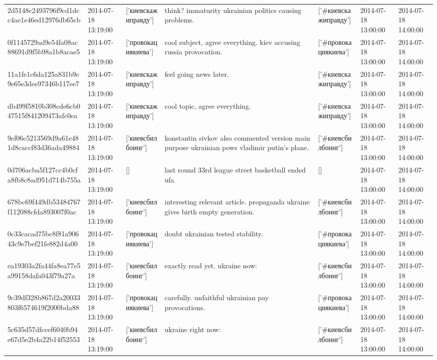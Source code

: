 \begin{tabular}{lllllll}
2d5148c2493796f9cd1dcc4ae1e46ed12976db65cb & 2014-07-18 13:19:00 & ['киевскажиправду'] & think? immaturity ukrainian politics causing problems. & ['#киевскажиправду'] & 2014-07-18 13:00:00 & 2014-07-18 14:00:00 \\
0f1145729ad9e54fa08ac88691d9f5b98a1b8acae5 & 2014-07-18 13:19:00 & ['провокациякиева'] & cool subject, agree everything. kiev accusing russia provocation. & ['#провокациякиева'] & 2014-07-18 13:00:00 & 2014-07-18 14:00:00 \\
11a1fe1c6da125a831b9e9e65e3dee97346b117ee7 & 2014-07-18 13:19:00 & ['киевскажиправду'] & feel going news later. & ['#киевскажиправду'] & 2014-07-18 13:00:00 & 2014-07-18 14:00:00 \\
db499f5810b308cde6cb047515f841209473afc0ea & 2014-07-18 13:19:00 & ['киевскажиправду'] & cool topic, agree everything. & ['#киевскажиправду'] & 2014-07-18 13:00:00 & 2014-07-18 14:00:00 \\
9ef06c5213569d9a61e481d8caccf83d36ada49884 & 2014-07-18 13:19:00 & ['киевсбилбоинг'] & konstantin sivkov also commented version main purpose ukrainian pows vladimir putin's plane. & ['#киевсбилбоинг'] & 2014-07-18 13:00:00 & 2014-07-18 14:00:00 \\
0d706acba5f127cc4b0cfa8fb8c8ad951d714b755a & 2014-07-18 13:19:00 & [] & last round 33rd league street basketball ended ufa & [] & 2014-07-18 13:00:00 & 2014-07-18 14:00:00 \\
678bc69f449db53484767f112088cfda893007f0ac & 2014-07-18 13:19:00 & ['киевсбилбоинг'] & interesting relevant article. propaganda ukraine gives birth empty generation. & ['#киевсбилбоинг'] & 2014-07-18 13:00:00 & 2014-07-18 14:00:00 \\
0c33cacad75bc8f81a90643c9e7bef21fe882d4a00 & 2014-07-18 13:19:00 & ['провокациякиева'] & doubt ukrainian tested stability. & ['#провокациякиева'] & 2014-07-18 13:00:00 & 2014-07-18 14:00:00 \\
ea19303a2fa44fa8ea77e5a99158dafa043f79a27a & 2014-07-18 13:19:00 & ['киевсбилбоинг'] & exactly read yet. ukraine now: & ['#киевсбилбоинг'] & 2014-07-18 13:00:00 & 2014-07-18 14:00:00 \\
9c39df328b867d2a20033803f6574619f2000bda88 & 2014-07-18 13:19:00 & ['провокациякиева'] & carefully. unfaithful ukrainian pay provocations. & ['#провокациякиева'] & 2014-07-18 13:00:00 & 2014-07-18 14:00:00 \\
5c635d57dfccef6040b94e67d5e2b4a22b14f52553 & 2014-07-18 13:19:00 & ['киевсбилбоинг'] & ukraine right now: & ['#киевсбилбоинг'] & 2014-07-18 13:00:00 & 2014-07-18 14:00:00 \\

\end{tabular}
